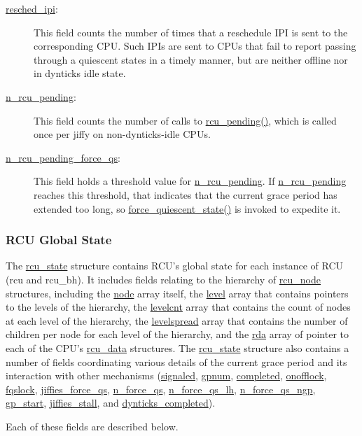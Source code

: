 \begin{description}
\item[\url{resched_ipi}:]
	This field counts the number of times that a reschedule IPI
	is sent to the corresponding CPU.
	Such IPIs are sent to CPUs that fail to report passing through
	a quiescent states in a timely manner, but are neither offline
	nor in dynticks idle state.
\item[\url{n_rcu_pending}:]
	This field counts the number of calls to \url{rcu_pending()},
	which is called once per jiffy on non-dynticks-idle CPUs.
\item[\url{n_rcu_pending_force_qs}:]
	This field holds a threshold value for \url{n_rcu_pending}.
	If \url{n_rcu_pending} reaches this threshold, that indicates
	that the current grace period has extended too long, so
	\url{force_quiescent_state()} is invoked to expedite it.
\end{description}

\subsubsection{RCU Global State}
\label{app:rcuimpl:rcutreewt:RCU Global State}

The \url{rcu_state} structure contains RCU's global state for
each instance of RCU (rcu and rcu\_bh).
It includes fields relating to
the hierarchy of \url{rcu_node} structures, including
the \url{node} array itself,
the \url{level} array that contains
pointers to the levels of the hierarchy,
the \url{levelcnt} array that contains the count of nodes at each level
of the hierarchy,
the \url{levelspread} array that contains the number of children
per node for each level of the hierarchy,
and the \url{rda} array of pointer to each of the CPU's
\url{rcu_data} structures.
The \url{rcu_state} structure also contains a number of fields
coordinating various details of the current grace period and its
interaction with other mechanisms (\url{signaled},
\url{gpnum}, \url{completed}, \url{onofflock}, \url{fqslock},
\url{jiffies_force_qs}, \url{n_force_qs}, \url{n_force_qs_lh},
\url{n_force_qs_ngp}, \url{gp_start}, \url{jiffies_stall},
and \url{dynticks_completed}).

Each of these fields are described below.

